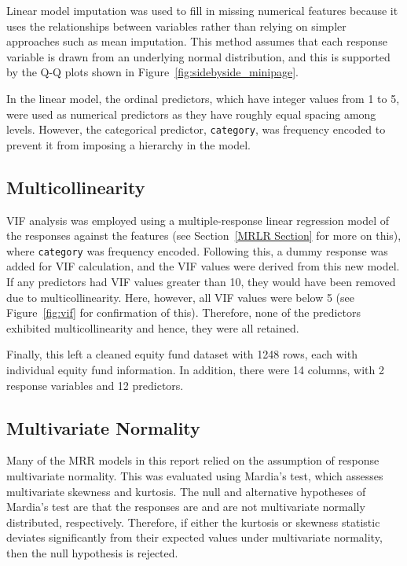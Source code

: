 \documentclass[11pt]{report} %
\begin{document}
Linear model imputation was used to fill in missing numerical features because it uses the relationships between variables rather than relying on simpler approaches such as mean imputation. This method assumes that each response variable is drawn from an underlying normal distribution, and this is supported by the Q-Q plots shown in Figure~\ref{fig:sidebyside_minipage}.\cite{Salgado2016}

In the linear model, the ordinal predictors, which have integer values from 1 to 5, were used as numerical predictors as they have roughly equal spacing among levels.\cite{openfunds2020} However, the categorical predictor, \texttt{category}, was frequency encoded to prevent it from imposing a hierarchy in the model. 

\vspace{-0.3cm}
\subsection{Multicollinearity}
\label{Multicollinearity}
VIF analysis was employed using a multiple-response linear regression model of the responses against the features (see Section~\ref{MRLR Section} for more on this), where \texttt{category} was frequency encoded. Following this, a dummy response was added for VIF calculation, and the VIF values were derived from this new model. 
If any predictors had VIF values greater than 10, they would have been removed due to multicollinearity. Here, however, all VIF values were below 5 (see Figure~\ref{fig:vif} for confirmation of this). Therefore, none of the predictors exhibited multicollinearity and hence, they were all retained.

\noindent Finally, this left a cleaned equity fund dataset with 1248 rows, each with individual equity fund information. In addition, there were 14 columns, with 2 response variables and 12 predictors.
\vspace{-0.2cm}
\subsection{Multivariate Normality}
\label{Multivariate Normality}
Many of the MRR models in this report relied on the assumption of response multivariate normality. This was evaluated using Mardia’s test, which assesses multivariate skewness and kurtosis.
The null and alternative hypotheses of Mardia's test are that the responses are and are not multivariate normally distributed, respectively. Therefore, if either the kurtosis or skewness statistic deviates significantly from their expected values under multivariate normality, then the null hypothesis is rejected.\cite{mardia2024multivariate} 
\end{document}
